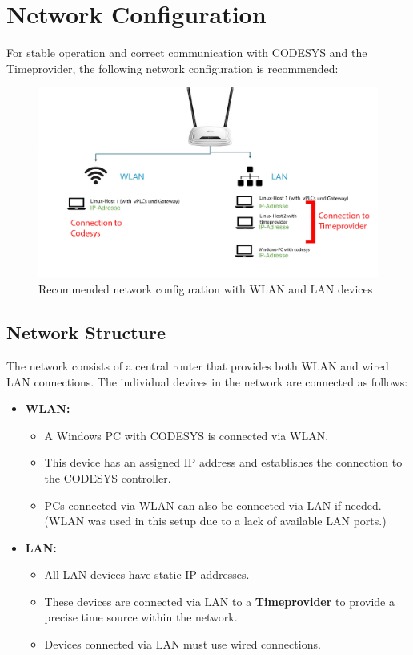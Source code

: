 \documentclass[a4paper,12pt]{article}
\begin{document}
\newpage



\newpage
\newpage
\section{Network Configuration}

For stable operation and correct communication with CODESYS and the Timeprovider, the following network configuration is recommended:

\begin{figure}[H]
	\centering
	\includegraphics[width=1\textwidth]{2n.png}
	\caption{Recommended network configuration with WLAN and LAN devices}
\end{figure}

\subsection*{Network Structure}

The network consists of a central router that provides both WLAN and wired LAN connections. The individual devices in the network are connected as follows:

\begin{itemize}
	\item \textbf{WLAN:}
	\begin{itemize}
		\item A Windows PC with CODESYS is connected via WLAN.
		\item This device has an assigned IP address and establishes the connection to the CODESYS controller.
		\item PCs connected via WLAN can also be connected via LAN if needed. (WLAN was used in this setup due to a lack of available LAN ports.)
	\end{itemize}
	
	\item \textbf{LAN:}
	\begin{itemize}
		\item All LAN devices have static IP addresses.
		\item These devices are connected via LAN to a \textbf{Timeprovider} to provide a precise time source within the network.
		\item Devices connected via LAN must use wired connections.
	\end{itemize}
\end{itemize}
\end{document}
